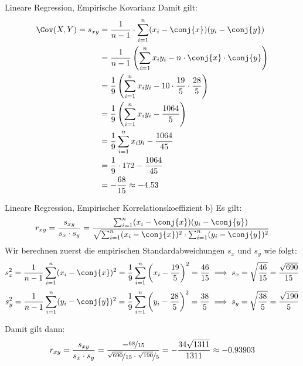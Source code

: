 \begin{example}{Lineare Regression, Empirische Kovarianz}
    Damit gilt:
    \begin{alignat*}{1}
        \Cov(X, Y) = s_{xy} & = \frac{1}{n-1} \cdot \sum_{i=1}^{n} (x_i - \conj{x})(y_i - \conj{y})                         \\
                            & = \frac{1}{n-1} \left( \sum_{i=1}^{n} x_iy_i - n \cdot \conj{x} \cdot \conj{y} \right)        \\
                            & = \frac{1}{9} \left( \sum_{i=1}^{n} x_iy_i - 10 \cdot \frac{19}{5} \cdot \frac{28}{5} \right) \\
                            & = \frac{1}{9} \left( \sum_{i=1}^{n} x_iy_i - \frac{1064}{5} \right)                           \\
                            & = \frac{1}{9} \sum_{i=1}^{n} x_iy_i - \frac{1064}{45}                                         \\
                            & = \frac{1}{9} \cdot 172 - \frac{1064}{45}                                                     \\
                            & = -\frac{68}{15} \approx -4.53
    \end{alignat*}
\end{example}

\begin{example}{Lineare Regression, Empirischer Korrelationskoeffizient}
    b) Es gilt:
    \[
        r_{xy} = \frac{s_{xy}}{s_x \cdot s_y} = \frac{\sum_{i=1}^{n} (x_i - \conj{x})(y_i - \conj{y})}{\sqrt{\sum_{i=1}^{n} (x_i - \conj{x})^2 \cdot \sum_{i=1}^{n} (y_i - \conj{y})^2 }}
    \]
    Wir berechnen zuerst die empirischen Standardabweichungen $s_x$ und $s_y$ wie folgt:
    \[
        s_x^2 = \frac{1}{n-1} \sum_{i=1}^{n} (x_i - \conj{x})^2 = \frac{1}{9} \sum_{i=1}^{n} \left(x_i - \frac{19}{5} \right)^2 = \frac{46}{15} \implies s_x = \sqrt{\frac{46}{15}} = \frac{\sqrt{690}}{15}
    \]
    \[
        s_y^2 = \frac{1}{n-1} \sum_{i=1}^{n} (y_i - \conj{y})^2 = \frac{1}{9} \sum_{i=1}^{n} \left(y_i - \frac{28}{5} \right)^2 = \frac{38}{5} \implies s_y = \sqrt{\frac{38}{5}} = \frac{\sqrt{190}}{5}
    \]

    Damit gilt dann:
    \[
        r_{xy} = \frac{s_{xy}}{s_x \cdot s_y} = \frac{-\nicefrac{68}{15}}{\nicefrac{\sqrt{690}}{15} \cdot \nicefrac{\sqrt{190}}{5}} = - \frac{34\sqrt{1311}}{1311} \approx -0.93903
    \]
\end{example}

